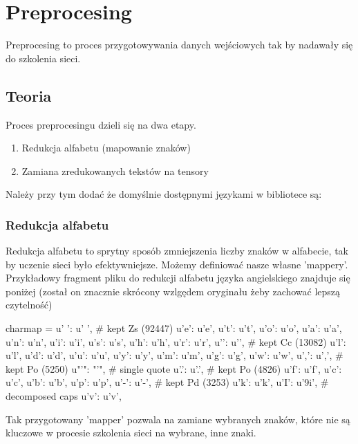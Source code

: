 \newpage
\section{Preprocesing}

Preprocesing to proces przygotowywania danych wejściowych tak by nadawały się do szkolenia sieci.

\subsection{Teoria}

Proces preprocesingu dzieli się na dwa etapy.
\begin{enumerate}
	\item Redukcja alfabetu (mapowanie znaków)
	\item Zamiana zredukowanych tekstów na tensory
\end{enumerate}

Należy przy tym dodać że domyślnie dostępnymi językami w bibliotece są:
\languages 


\subsubsection{Redukcja alfabetu}
Redukcja alfabetu to sprytny sposób zmniejszenia liczby znaków w alfabecie, tak by uczenie sieci było
efektywniejsze. Możemy definiować nasze własne 'mappery'. Przykładowy fragment pliku do redukcji alfabetu języka
angielskiego znajduje się poniżej (został on znacznie skrócony wzlgędem oryginału żeby zachować lepszą
czytelność)

\begin{python}
charmap = {
    u' ': u' ',                 # kept Zs (92447)
    u'e': u'e',
    u't': u't',
    u'o': u'o',
    u'a': u'a',
    u'n': u'n',
    u'i': u'i',
    u's': u's',
    u'h': u'h',
    u'r': u'r',
    u'\n': u'\n',               # kept Cc (13082)
    u'l': u'l',
    u'd': u'd',
    u'u': u'u',
    u'y': u'y',
    u'm': u'm',
    u'g': u'g',
    u'w': u'w',
    u',': u',',                 # kept Po (5250)
    u"'": "'",                  # single quote
    u'.': u'.',                 # kept Po (4826)
    u'f': u'f',
    u'c': u'c',
    u'b': u'b',
    u'p': u'p',
    u'-': u'-',                 # kept Pd (3253)
    u'k': u'k',
    u'I': u'\xb9i',             # decomposed caps
    u'v': u'v',
}
\end{python}

Tak przygotowany 'mapper' pozwala na zamiane wybranych znaków, które nie są kluczowe w procesie 
szkolenia sieci na wybrane, inne znaki.

